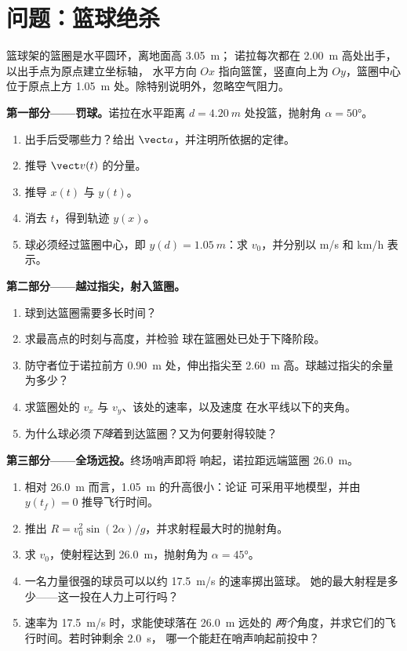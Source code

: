 \section{问题：篮球绝杀}

\begin{problem}
\label{pb:g12:projectile-motion:1}
篮球架的篮圈是水平圆环，离地面高 \qty{3.05}{m}；
诺拉每次都在 \qty{2.00}{m} 高处出手，以出手点为原点建立坐标轴，
水平方向 $Ox$ 指向篮筐，竖直向上为 $Oy$，篮圈中心
位于原点上方 \qty{1.05}{m} 处。除特别说明外，忽略空气阻力。

\medskip\noindent\textbf{第一部分——罚球。}诺拉在水平距离
$d = \qty{4.20}{m}$ 处投篮，抛射角 $\alpha = \ang{50}$。
\begin{enumerate}
  \item 出手后受哪些力？给出 $\vect a$，并注明所依据的定律。
  \item 推导 $\vect v(t)$ 的分量。
  \item 推导 $x(t)$ 与 $y(t)$。
  \item 消去 $t$，得到轨迹 $y(x)$。
  \item 球必须经过篮圈中心，即 $y(d) = \qty{1.05}{m}$：求
        $v_0$，并分别以 \unit{m/s} 和 \unit{km/h} 表示。
\end{enumerate}

\medskip\noindent\textbf{第二部分——越过指尖，射入篮圈。}
\begin{enumerate}[resume]
  \item 球到达篮圈需要多长时间？
  \item 求最高点的时刻与高度，并检验
        球在篮圈处已处于下降阶段。
  \item 防守者位于诺拉前方 \qty{0.90}{m} 处，伸出指尖至
        \qty{2.60}{m} 高。球越过指尖的余量为多少？
  \item 求篮圈处的 $v_x$ 与 $v_y$、该处的速率，以及速度
        在水平线以下的夹角。
  \item 为什么球必须\emph{下降}着到达篮圈？又为何要射得较陡？
\end{enumerate}

\medskip\noindent\textbf{第三部分——全场远投。}终场哨声即将
响起，诺拉距远端篮圈 \qty{26.0}{m}。
\begin{enumerate}[resume]
  \item 相对 \qty{26.0}{m} 而言，\qty{1.05}{m} 的升高很小：论证
        可采用平地模型，并由 $y(t_f) = 0$ 推导飞行时间。
  \item 推出 $R = v_0^2\sin(2\alpha)/g$，并求射程最大时的抛射角。
  \item 求 $v_0$，使射程达到 \qty{26.0}{m}，抛射角为 $\alpha = \ang{45}$。
  \item 一名力量很强的球员可以以约 \qty{17.5}{m/s} 的速率掷出篮球。
        她的最大射程是多少——这一投在人力上可行吗？
  \item 速率为 \qty{17.5}{m/s} 时，求能使球落在 \qty{26.0}{m} 远处的
        \emph{两个}角度，并求它们的飞行时间。若时钟剩余 \qty{2.0}{s}，
        哪一个能赶在哨声响起前投中？
\end{enumerate}


\end{problem}
